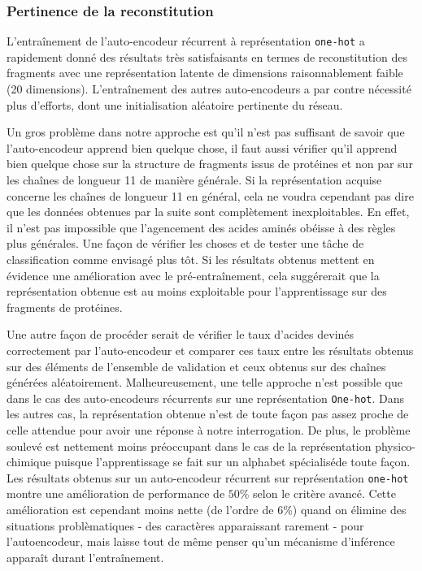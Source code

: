 \documentclass[a4paper, 11pt, onecolumn]{article}
\begin{document}
\subsubsection{Pertinence de la reconstitution}

L'entraînement de l'auto-encodeur récurrent à représentation \texttt{one-hot} a rapidement donné des résultats très
satisfaisants en termes de reconstitution des fragments  avec une représentation
latente de dimensions raisonnablement faible (20 dimensions). L'entraînement des
autres auto-encodeurs a par contre nécessité plus d'efforts, dont une
initialisation aléatoire pertinente du réseau.

Un gros problème dans notre approche est qu'il n'est pas suffisant de savoir que
l'auto-encodeur apprend bien quelque chose, il faut aussi vérifier qu'il apprend
bien quelque chose sur la structure de fragments issus de protéines et non par
sur les chaînes de longueur 11 de manière générale. Si la représentation acquise
concerne les chaînes de longueur 11 en général, cela ne voudra cependant pas dire que les
données obtenues par la suite sont complètement inexploitables. En effet, il
n'est pas impossible que l'agencement des acides aminés obéisse à des règles
plus générales.
Une façon de vérifier les
choses et de tester une tâche de classification comme envisagé plus tôt. Si
les résultats obtenus mettent en évidence une amélioration avec le pré-entraînement, cela suggérerait que la représentation
obtenue est au moins exploitable pour l'apprentissage sur des fragments de
protéines. 

Une autre façon de procéder serait de vérifier le taux d'acides
devinés correctement par l'auto-encodeur et comparer ces taux entre les résultats
obtenus sur des éléments de l'ensemble de validation et ceux obtenus sur des
chaînes générées aléatoirement.
Malheureusement, une telle approche n'est possible que dans le cas des
auto-encodeurs récurrents sur une représentation \texttt{One-hot}. Dans les
autres cas, la représentation obtenue n'est de toute façon pas assez proche de
celle attendue pour avoir une réponse à notre interrogation. De plus, le
problème soulevé est nettement moins préoccupant dans le cas de la
représentation physico-chimique puisque l'apprentissage se fait sur un alphabet
\og spécialisé\fg de toute façon. Les résultats obtenus sur un auto-encodeur
récurrent sur représentation \texttt{one-hot} montre une amélioration de
performance de $50\%$ selon le critère avancé. Cette amélioration est cependant
 moins nette (de l'ordre de 6\%) quand on élimine des situations
problèmatiques - des caractères apparaissant rarement - pour l'autoencodeur,
mais laisse tout de même penser qu'un mécanisme d'inférence apparaît durant l'entraînement.
\end{document}
